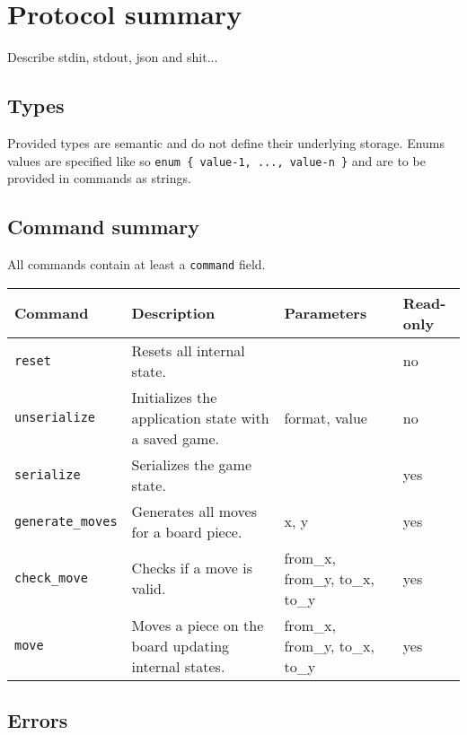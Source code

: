 \section{Protocol summary}

Describe stdin, stdout, json and shit...

\subsection{Types}


Provided types are semantic and do not define their underlying storage. Enums values are specified like so \texttt{enum \{ value-1, ..., value-n \}} and are to be provided in commands as strings.

\subsection{Command summary}

All commands contain at least a \texttt{command} field.

\begin{center}
\begin{tabu} to\linewidth {X[l, -2] | X[l, 4] | X[l, -1] | X[c, -1]}
    Command
        & Description
        & Parameters
        & Read-only \\ \hline \hline
    \texttt{reset}
        & Resets all internal state.
        &
        & no \\
    \texttt{unserialize}
        & Initializes the application state with a saved game.
        & format, value
        & no \\
    \texttt{serialize}
        & Serializes the game state.
        &
        & yes \\
    \texttt{generate\_moves}
        & Generates all moves for a board piece.
        & x, y
        & yes \\
    \texttt{check\_move}
        & Checks if a move is valid.
        & from\_x, from\_y, to\_x, to\_y
        & yes \\
    \texttt{move}
        & Moves a piece on the board updating internal states.
        & from\_x, from\_y, to\_x, to\_y
        & yes \\
\end{tabu}
\end{center}

\subsection{Errors}

